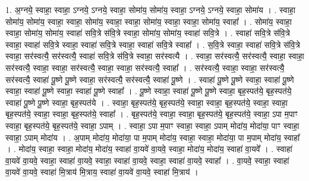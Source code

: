 \documentclass[17pt]{extarticle}
\begin{document}
1. अ॒ग्नये॒ स्वाहा॒ स्वाहा॒ ऽग्नये॒ ऽग्नये॒ स्वाहा॒ सोमा॑य॒ सोमा॑य॒ स्वाहा॒ ऽग्नये॒ ऽग्नये॒ स्वाहा॒ सोमा॑य । . स्वाहा॒ सोमा॑य॒ सोमा॑य॒ स्वाहा॒ स्वाहा॒ सोमा॑य॒ स्वाहा॒ स्वाहा॒ सोमा॑य॒ स्वाहा॒ स्वाहा॒ सोमा॑य॒ स्वाहा᳚ । . सोमा॑य॒ स्वाहा॒ स्वाहा॒ सोमा॑य॒ सोमा॑य॒ स्वाहा॑ सवि॒त्रे स॑वि॒त्रे स्वाहा॒ सोमा॑य॒ सोमा॑य॒ स्वाहा॑ सवि॒त्रे । . स्वाहा॑ सवि॒त्रे स॑वि॒त्रे स्वाहा॒ स्वाहा॑ सवि॒त्रे स्वाहा॒ स्वाहा॑ सवि॒त्रे स्वाहा॒ स्वाहा॑ सवि॒त्रे स्वाहा᳚ । . स॒वि॒त्रे स्वाहा॒ स्वाहा॑ सवि॒त्रे स॑वि॒त्रे स्वाहा॒ सर॑स्वत्यै॒ सर॑स्वत्यै॒ स्वाहा॑ सवि॒त्रे स॑वि॒त्रे स्वाहा॒ सर॑स्वत्यै । . स्वाहा॒ सर॑स्वत्यै॒ सर॑स्वत्यै॒ स्वाहा॒ स्वाहा॒ सर॑स्वत्यै॒ स्वाहा॒ स्वाहा॒ सर॑स्वत्यै॒ स्वाहा॒ स्वाहा॒ सर॑स्वत्यै॒ स्वाहा᳚ । . सर॑स्वत्यै॒ स्वाहा॒ स्वाहा॒ सर॑स्वत्यै॒ सर॑स्वत्यै॒ स्वाहा॑ पू॒ष्णे पू॒ष्णे स्वाहा॒ सर॑स्वत्यै॒ सर॑स्वत्यै॒ स्वाहा॑ पू॒ष्णे । . स्वाहा॑ पू॒ष्णे पू॒ष्णे स्वाहा॒ स्वाहा॑ पू॒ष्णे स्वाहा॒ स्वाहा॑ पू॒ष्णे स्वाहा॒ स्वाहा॑ पू॒ष्णे स्वाहा᳚ । . पू॒ष्णे स्वाहा॒ स्वाहा॑ पू॒ष्णे पू॒ष्णे स्वाहा॒ बृह॒स्पत॑ये॒ बृह॒स्पत॑ये॒ स्वाहा॑ पू॒ष्णे पू॒ष्णे स्वाहा॒ बृह॒स्पत॑ये । . स्वाहा॒ बृह॒स्पत॑ये॒ बृह॒स्पत॑ये॒ स्वाहा॒ स्वाहा॒ बृह॒स्पत॑ये॒ स्वाहा॒ स्वाहा॒ बृह॒स्पत॑ये॒ स्वाहा॒ स्वाहा॒ बृह॒स्पत॑ये॒ स्वाहा᳚ । . बृह॒स्पत॑ये॒ स्वाहा॒ स्वाहा॒ बृह॒स्पत॑ये॒ बृह॒स्पत॑ये॒ स्वाहा॒ ऽपा म॒पाꣳ स्वाहा॒ बृह॒स्पत॑ये॒ बृह॒स्पत॑ये॒ स्वाहा॒ ऽपाम् । . स्वाहा॒ ऽपा म॒पाꣳ स्वाहा॒ स्वाहा॒ ऽपाम् मोदा॑य॒ मोदा॑या॒ पाꣳ स्वाहा॒ स्वाहा॒ ऽपाम् मोदा॑य । . अ॒पाम् मोदा॑य॒ मोदा॑या॒ पा म॒पाम् मोदा॑य॒ स्वाहा॒ स्वाहा॒ मोदा॑या॒ पा म॒पाम् मोदा॑य॒ स्वाहा᳚ । . मोदा॑य॒ स्वाहा॒ स्वाहा॒ मोदा॑य॒ मोदा॑य॒ स्वाहा॑ वा॒यवे॑ वा॒यवे॒ स्वाहा॒ मोदा॑य॒ मोदा॑य॒ स्वाहा॑ वा॒यवे᳚ । . स्वाहा॑ वा॒यवे॑ वा॒यवे॒ स्वाहा॒ स्वाहा॑ वा॒यवे॒ स्वाहा॒ स्वाहा॑ वा॒यवे॒ स्वाहा॒ स्वाहा॑ वा॒यवे॒ स्वाहा᳚ । . वा॒यवे॒ स्वाहा॒ स्वाहा॑ वा॒यवे॑ वा॒यवे॒ स्वाहा॑ मि॒त्राय॑ मि॒त्राय॒ स्वाहा॑ वा॒यवे॑ वा॒यवे॒ स्वाहा॑ मि॒त्राय॑ । \newline
\end{document}
